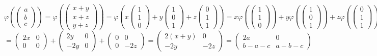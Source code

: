 \documentclass[a4paper,graphics,11pt]{article}
\begin{document}
$$
    \varphi(\begin{pmatrix}a\\b\\c\end{pmatrix})
    =
    \varphi(\begin{pmatrix}x+y\\x+z\\y+z\end{pmatrix})
    =
    \varphi(x\begin{pmatrix}1\\1\\0\end{pmatrix}
        +
    y\begin{pmatrix}1\\0\\1\end{pmatrix}
        +
    z\begin{pmatrix}0\\1\\1\end{pmatrix})
    =
    x\varphi(\begin{pmatrix}1\\1\\0\end{pmatrix})
        +
    y\varphi(\begin{pmatrix}1\\0\\1\end{pmatrix})
        +
    z\varphi(\begin{pmatrix}0\\1\\1\end{pmatrix})
$$$$
    =
    \begin{pmatrix}
    2x & 0\\
    0 & 0
    \end{pmatrix}
    +
    \begin{pmatrix}
    2y & 0\\
    -2y & 0
    \end{pmatrix}
    +
    \begin{pmatrix}
    0 & 0\\
    0 & -2z
    \end{pmatrix}
    =
    \begin{pmatrix}
    2(x+y) & 0\\
    -2y & -2z
    \end{pmatrix}
    =
    \begin{pmatrix}
    2a & 0\\
    b-a-c & a-b-c
    \end{pmatrix}
$$
\end{document}

